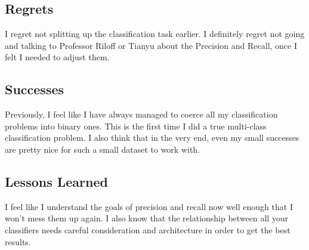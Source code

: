 \documentclass{article}
\begin{document}
    \subsection{Regrets}

    I regret not splitting up the classification task earlier. I definitely regret not going and talking to Professor Riloff or Tianyu about the Precision and Recall, once I felt I needed to adjust them.
    \subsection{Successes}
    Previously, I feel like I have always managed to coerce all my classification problems into binary ones. This is the first time I did a true multi-class classification problem. I also think that in the very end, even my small successes are pretty nice for such a small dataset to work with.
    \subsection{Lessons Learned}
    I feel like I understand the goals of precision and recall now well enough that I won't mess them up again. I also know that the relationship between all your classifiers needs careful consideration and architecture in order to get the best results.
\end{document}
